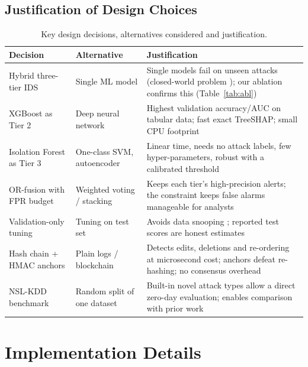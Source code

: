 \documentclass[12pt,a4paper,oneside]{article}
\begin{document}
\subsection{Justification of Design Choices}
\begin{table}[H]\centering\small
\caption{Key design decisions, alternatives considered and justification.}\label{tab:just}
\begin{tabularx}{\linewidth}{p{3.2cm} p{3.4cm} Y}
\toprule
\textcolor{rblue}{Decision} & \textcolor{rblue}{Alternative} & \textcolor{rblue}{Justification} \\ \midrule
Hybrid three-tier IDS & Single ML model & Single models fail on unseen attacks (closed-world problem \cite{sommer2010outside}); our ablation confirms this (Table~\ref{tab:abl}) \\
XGBoost as Tier 2 & Deep neural network & Highest validation accuracy/AUC on tabular data; fast exact TreeSHAP; small CPU footprint \\
Isolation Forest as Tier 3 & One-class SVM, autoencoder & Linear time, needs no attack labels, few hyper-parameters, robust with a calibrated threshold \\
OR-fusion with FPR budget & Weighted voting / stacking & Keeps each tier's high-precision alerts; the constraint keeps false alarms manageable for analysts \\
Validation-only tuning & Tuning on test set & Avoids data snooping \cite{arp2022dos}; reported test scores are honest estimates \\
Hash chain + HMAC anchors & Plain logs / blockchain & Detects edits, deletions and re-ordering at microsecond cost; anchors defeat re-hashing; no consensus overhead \\
NSL-KDD benchmark & Random split of one dataset & Built-in novel attack types allow a direct zero-day evaluation; enables comparison with prior work \\
\bottomrule
\end{tabularx}
\end{table}

\section{Implementation Details}
\end{document}
